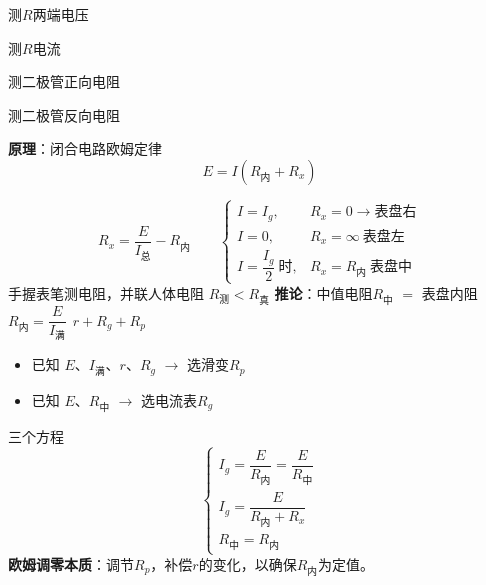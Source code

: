 \begin{center}
\begin{minipage}[t]{0.23\linewidth}\centering
测$R$两端电压
\end{minipage}\hfill
\begin{minipage}[t]{0.23\linewidth}\centering
测$R$电流
\end{minipage}\hfill
\begin{minipage}[t]{0.23\linewidth}\centering
测二极管正向电阻
\end{minipage}\hfill
\begin{minipage}[t]{0.23\linewidth}\centering
测二极管反向电阻
\end{minipage}
\end{center}
\textbf{原理}：闭合电路欧姆定律
\[
E=I(R_{\text{内}}+R_x)
\]


\[
R_x=\frac{E}{I_{\text{总}}}-R_{\text{内}}
\qquad
\begin{cases}
I=I_g, & R_x=0\to\text{表盘右}\\
I=0, & R_x=\infty\ \text{表盘左}\\
I=\dfrac{I_g}{2}\ \text{时}, & R_x=R_{\text{内}}\ \text{表盘中}
\end{cases}
\]
手握表笔测电阻，并联人体电阻 $R_{\text{测}}<R_{\text{真}}$
\textbf{推论}：中值电阻$R_{\text{中}}$ $=$ 表盘内阻 $R_{\text{内}}=\dfrac{E}{I_{\text{满}}}\ \ r+R_g+R_p$

\begin{itemize}
\item 已知 $E$、$I_{\text{满}}$、$r$、$R_g$ $\to$ 选滑变$R_p$
\item 已知 $E$、$R_{\text{中}}$ $\to$ 选电流表$R_g$
\end{itemize}

三个方程
\[
\begin{cases}
I_g=\dfrac{E}{R_{\text{内}}}=\dfrac{E}{R_{\text{中}}}\\[1.2ex]
I_g=\dfrac{E}{R_{\text{内}}+R_x}\\[1.2ex]
R_{\text{中}}=R_{\text{内}}
\end{cases}
\]
\textbf{欧姆调零本质}：调节$R_p$，补偿$r$的变化，以确保$R_{\text{内}}$为定值。

